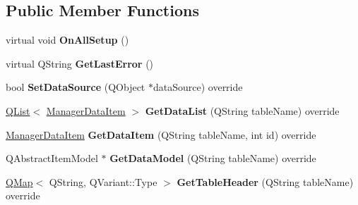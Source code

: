 \subsection*{Public Member Functions}
\begin{DoxyCompactItemize}
\item 
\mbox{\label{class_extendable_data_base_manager_plugin_a8331c3bd54725a10f79bcacde178774b}} 
virtual void {\bfseries On\+All\+Setup} ()
\item 
\mbox{\label{class_extendable_data_base_manager_plugin_a168d8e9dadf224d24c855fe376569857}} 
virtual Q\+String {\bfseries Get\+Last\+Error} ()
\item 
\mbox{\label{class_extendable_data_base_manager_plugin_aa28d8bd15f2547b70e82452bdd8d0c70}} 
bool {\bfseries Set\+Data\+Source} (Q\+Object $\ast$data\+Source) override
\item 
\mbox{\label{class_extendable_data_base_manager_plugin_a2c2450f08baccb26e3aade32a5879f27}} 
\hyperlink{class_q_list}{Q\+List}$<$ \hyperlink{class_i_extendable_data_base_manager_plugin_1_1_manager_data_item}{Manager\+Data\+Item} $>$ {\bfseries Get\+Data\+List} (Q\+String table\+Name) override
\item 
\mbox{\label{class_extendable_data_base_manager_plugin_a1027e67334110767807dccd64cd4946d}} 
\hyperlink{class_i_extendable_data_base_manager_plugin_1_1_manager_data_item}{Manager\+Data\+Item} {\bfseries Get\+Data\+Item} (Q\+String table\+Name, int id) override
\item 
\mbox{\label{class_extendable_data_base_manager_plugin_a32a7f0127593a70e827b39a462cb6d02}} 
Q\+Abstract\+Item\+Model $\ast$ {\bfseries Get\+Data\+Model} (Q\+String table\+Name) override
\item 
\mbox{\label{class_extendable_data_base_manager_plugin_a8ddef0ec955d01c3e59f5dec90eed26b}} 
\hyperlink{class_q_map}{Q\+Map}$<$ Q\+String, Q\+Variant\+::\+Type $>$ {\bfseries Get\+Table\+Header} (Q\+String table\+Name) override

\end{DoxyCompactItemize}
